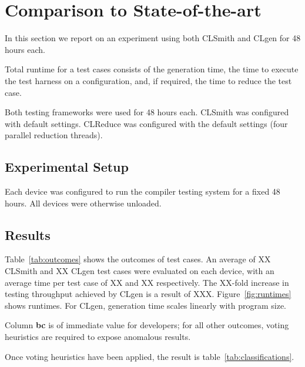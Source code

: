 \section{Comparison to State-of-the-art}\label{sec:vs_clsmith}

In this section we report on an experiment using both CLSmith and CLgen for 48 hours each.

Total runtime for a test cases consists of the generation time, the time to execute the test harness on a configuration, and, if required, the time to reduce the test case.

Both testing frameworks were used for 48 hours each. CLSmith was configured with default settings. CLReduce was configured with the default settings (four parallel reduction threads).

\subsection{Experimental Setup}

Each device was configured to run the compiler testing system for a fixed 48 hours. All devices were otherwise unloaded.

\subsection{Results}

Table~\ref{tab:outcomes} shows the outcomes of test cases. An average of XX CLSmith and XX CLgen test cases were evaluated on each device, with an average time per test case of XX and XX respectively. The XX-fold increase in testing throughput achieved by CLgen is a result of XXX. Figure~\ref{fig:runtimes} shows runtimes. For CLgen, generation time scales linearly with program size.

Column \textbf{bc} is of immediate value for developers; for all other outcomes, voting heuristics are required to expose anomalous results.

Once voting heuristics have been applied, the result is table~\ref{tab:classifications}.

